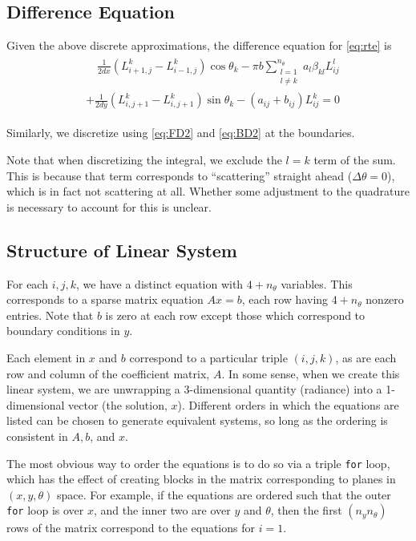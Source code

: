 \documentclass[10pt]{article}
\begin{document}
\begin{multicols}{2}
\subsection{Difference Equation}
Given the above discrete approximations, the difference equation for \eqref{eq:rte} is
\begin{align}
	\label{eq:diffeq}
	\begin{split}
	&\quad\frac{1}{2dx}\left(L_{i+1,j}^k - L_{i-1,j}^k\right) \cos\theta_k 
	- \pi b \sum_{\substack{l=1\\ l\neq k}}^{n_\theta} a_l\beta_{kl}L_{ij}^l \\
	&+ \frac{1}{2dy}\left(L_{i,j+1}^k - L_{i,j+1}^k\right) \sin\theta_k 
	- (a_{ij} + b_{ij})L_{ij}^k
	=0
	\end{split}
\end{align}

Similarly, we discretize using \eqref{eq:FD2} and \eqref{eq:BD2} at the boundaries.

Note that when discretizing the integral, we exclude the $l=k$ term of the sum.
This is because that term corresponds to ``scattering'' straight ahead ($\Delta\theta=0$), which is in fact not scattering at all.
Whether some adjustment to the quadrature is necessary to account for this is unclear.

\subsection{Structure of Linear System}
For each $i,j,k$, we have a distinct equation with $4+n_\theta$ variables.
This corresponds to a sparse matrix equation $Ax=b$, each row having $4+n_\theta$ nonzero entries.
Note that $b$ is zero at each row except those which correspond to boundary conditions in $y$.

Each element in $x$ and $b$ correspond to a particular triple $(i,j,k)$, as are each row and column of the coefficient matrix, $A$.
In some sense, when we create this linear system, we are unwrapping a 3-dimensional quantity (radiance) into a 1-dimensional vector (the solution, $x$).
Different orders in which the equations are listed can be chosen to generate equivalent systems, so long as the ordering is consistent in $A,b$, and $x$.

The most obvious way to order the equations is to do so via a triple \texttt{for} loop, which has the effect of creating blocks in the matrix corresponding to planes in $(x,y,\theta)$ space.
For example, if the equations are ordered such that the outer \texttt{for} loop is over $x$, and the inner two are over $y$ and $\theta$, then the first $(n_y n_\theta)$ rows of the matrix correspond to the equations for $i=1$.


\end{multicols}
\end{document}
